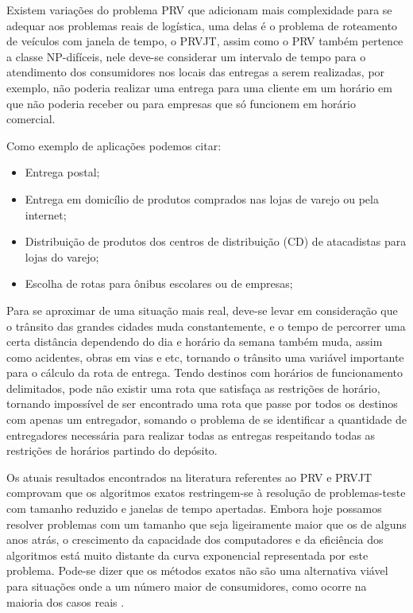 Existem variações do problema PRV que adicionam mais complexidade para se adequar aos problemas reais de logística, uma delas é o problema de roteamento de veículos com janela de tempo, o PRVJT, assim como o PRV também pertence a classe NP-difíceis, nele deve-se considerar um intervalo de tempo para o atendimento dos consumidores nos locais das entregas a serem realizadas, por exemplo, não poderia realizar uma entrega para uma cliente em um horário em que não poderia receber ou para empresas que só funcionem em horário comercial. 

Como exemplo de aplicações podemos citar:
\begin{itemize}
	\item Entrega postal;
	\item Entrega em domicílio de produtos comprados nas lojas de varejo ou pela internet;
	\item Distribuição de produtos dos centros de distribuição (CD) de atacadistas para lojas do varejo;
	\item Escolha de rotas para ônibus escolares ou de empresas;
\end{itemize}

Para se aproximar de uma situação mais real, deve-se levar em consideração que o trânsito das grandes cidades muda constantemente, e o tempo de percorrer uma certa distância dependendo do dia e horário da semana também muda, assim como acidentes, obras em vias e etc, tornando o trânsito uma variável importante para o cálculo da rota de entrega. Tendo destinos com horários de funcionamento delimitados, pode não existir uma rota que satisfaça as restrições de horário, tornando impossível de ser encontrado uma rota que passe por todos os destinos com apenas um entregador, somando o problema de se identificar a quantidade de entregadores necessária para realizar todas as entregas respeitando todas as restrições de horários partindo do depósito. 

Os atuais resultados encontrados na literatura referentes ao PRV e PRVJT comprovam que os algoritmos exatos restringem-se à resolução de problemas-teste com tamanho reduzido e janelas de tempo apertadas. Embora hoje possamos resolver problemas com um tamanho que seja ligeiramente maior que os de alguns anos atrás, o crescimento da capacidade dos computadores e da eficiência dos algoritmos está muito distante da curva exponencial representada por este problema. Pode-se dizer que os métodos exatos não são uma alternativa viável para situações onde a um número maior de consumidores, como ocorre na maioria dos casos reais \cite{Chabrier}.

